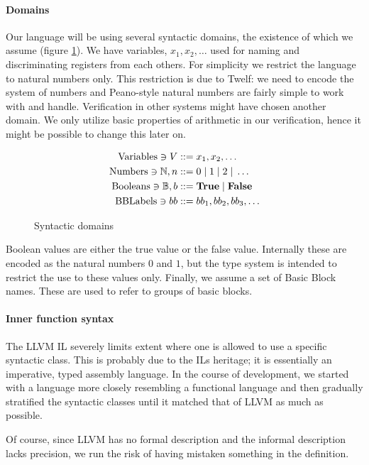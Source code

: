 \documentclass[a4paper, oneside, 10pt, draft]{memoir}
\begin{document}
\paragraph{Domains}

Our language will be using several syntactic domains, the existence of
which we assume (figure \ref{fig:syntactic-domains}). We have
variables, $x_1, x_2, \dotsc$ used for naming and discriminating
registers from each others. For simplicity we restrict the language to
natural numbers only. This restriction is due to Twelf: we need to
encode the system of numbers and Peano-style natural numbers are
fairly simple to work with and handle. Verification in other systems
might have chosen another domain. We only utilize basic properties of
arithmetic in our verification, hence it might be possible to change
this later on.
\begin{figure}
  \begin{align*}
    \mathrm{Variables} \ni V & ::= x_1, x_2, \dotsc \\
    \mathrm{Numbers} \ni \mathbb{N}, n & ::= 0 \; \vert \; 1 \; \vert \; 2 \; \vert \; \dotsc\\
    \mathrm{Booleans} \ni \mathbb{B}, b & ::= \mathbf{True} \; \vert \; \mathbf{False} \\
    \mathrm{BB Labels} \ni bb & ::= bb_1, bb_2, bb_3, \dotsc
  \end{align*}
  \caption{Syntactic domains}
  \label{fig:syntactic-domains}
\end{figure}

Boolean values are either the true value or the false
value. Internally these are encoded as the natural numbers $0$ and
$1$, but the type system is intended to restrict the use to these
values only. Finally, we assume a set of Basic Block names. These are used to refer
to groups of basic blocks.

\paragraph{Inner function syntax}

The LLVM IL severely limits extent where one is allowed to use a
specific syntactic class. This is probably due to the ILs heritage; it
is essentially an imperative, typed assembly language. In the course
of development, we started with a language more closely resembling a
functional language and then gradually stratified the syntactic
classes until it matched that of LLVM as much as possible.

Of course, since LLVM has no formal description and the informal
description lacks precision\cite{lattner.ea:2009:llvm-ref}, we run the
risk of having mistaken something in the definition.
\end{document}
